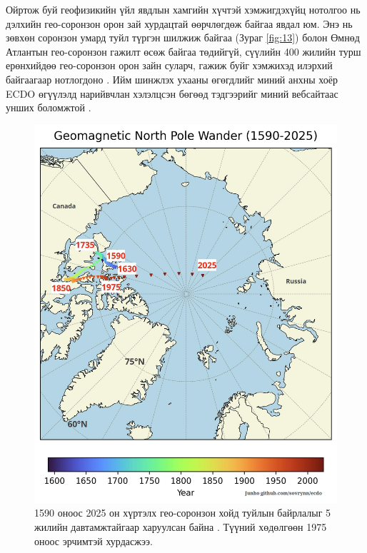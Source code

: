 \documentclass[10pt,twocolumn,letterpaper]{article}
\begin{document}
Ойртож буй геофизикийн үйл явдлын хамгийн хүчтэй хэмжигдэхүйц нотолгоо нь дэлхийн гео-соронзон орон зай хурдацтай өөрчлөгдөж байгаа явдал юм. Энэ нь зөвхөн соронзон умард туйл түргэн шилжиж байгаа (Зураг \ref{fig:13}) болон Өмнөд Атлантын гео-соронзон гажилт өсөж байгаа төдийгүй, сүүлийн 400 жилийн турш ерөнхийдөө гео-соронзон орон зайн суларч, гажиж буйг хэмжихэд илэрхий байгаагаар нотлогдоно \cite{3}. Ийм шинжлэх ухааны өгөгдлийг миний анхны хоёр ECDO өгүүлэлд нарийвчлан хэлэлцсэн бөгөөд тэдгээрийг миний вебсайтаас унших боломжтой \cite{3}.

\begin{figure}[t]
\begin{center}
   \includegraphics[width=1\linewidth]{npw.jpg}
\end{center}
   \caption{1590 оноос 2025 он хүртэлх гео-соронзон хойд туйлын байрлалыг 5 жилийн давтамжтайгаар харуулсан байна \cite{41}. Түүний хөдөлгөөн 1975 оноос эрчимтэй хурдасжээ.}
\label{fig:13}
\label{fig:onecol}
\end{figure}
\end{document}
